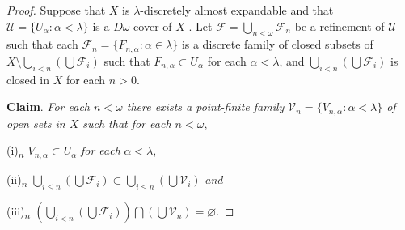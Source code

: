 \documentclass[main.tex]{subfiles}
\begin{document}
\begin{proof}
Suppose that  $X$  is $\lambda$-discretely almost expandable and that 
$\mathscr{U} = \{U_\alpha: \alpha < \lambda\}$ is a $D\omega$-cover of  $X$ . 
Let $\mathscr{F} = \bigcup_{n<\omega} \mathscr{F}_n$ be a refinement of $\mathscr{U}$ 
such that each $\mathscr{F}_n = \{F_{n,\alpha}: \alpha \in \lambda\}$ 
is a discrete  family of closed subsets of  $X\setminus\bigcup_{i<n}(\bigcup \mathscr{F}_i)$
such that $F_{n,\alpha}\subset U_\alpha$ for each $\alpha < \lambda$, 
and $\bigcup_{i<n}(\bigcup \mathscr{F}_i)$ is closed in  $X$  
for each $n >0$.

\textbf{Claim}. \textit{For each $n < \omega$  there exists a point-finite family $\mathscr{V}_n = \{V_{n,\alpha}: \alpha < \lambda\}$ of open sets in $X$ such that for each $n < \omega$},

(i)\textsubscript{$n$} $V_{n,\alpha} \subset U_\alpha$ \textit{ for each } $\alpha < \lambda$,

(ii)\textsubscript{$n$}   $\bigcup_{i \le n} (\bigcup \mathscr{F}_i) \subset \bigcup_{i \le n} (\bigcup \mathscr{V}_i)$ \textit{and}

(iii)\textsubscript{$n$}    $(\bigcup_{i < n} (\bigcup \mathscr{F}_i)) \bigcap
(\bigcup \mathscr{V}_n) = \varnothing$. 


\end{proof}
\end{document}
